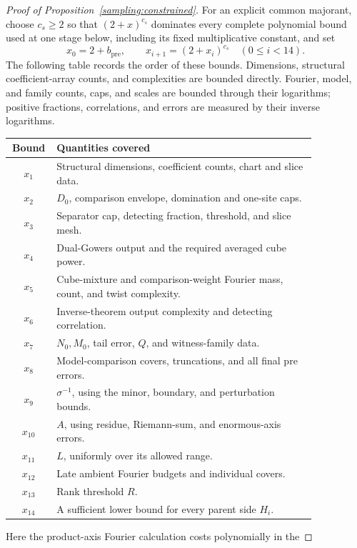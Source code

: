 \begin{proof}[Proof of Proposition~\ref{sampling:constrained}]
For an explicit common majorant, choose $c_s\ge2$ so that $(2+x)^{c_s}$ dominates every
complete polynomial bound used at one stage below, including its
fixed multiplicative constant, and set
\begin{equation}\label{cube:budget-majorant}
 x_0=2+b_{\mathrm{pre}},\qquad
 x_{i+1}=(2+x_i)^{c_s}\quad(0\le i<14).
\end{equation}
The following table records the order of these bounds.  Dimensions,
structural coefficient-array counts, and complexities are bounded
directly. Fourier, model, and family counts, caps, and scales are
bounded through their logarithms; positive fractions, correlations,
and errors are measured by their inverse logarithms.
\begin{center}
\small
\begin{tabular}{@{}cp{0.85\linewidth}@{}}
\toprule
Bound & Quantities covered\\
\midrule
$x_1$ & Structural dimensions, coefficient counts, chart and slice data.\\
$x_2$ & $D_0$, comparison envelope, domination and one-site caps.\\
$x_3$ & Separator cap, detecting fraction, threshold, and slice mesh.\\
$x_4$ & Dual-Gowers output and the required averaged cube power.\\
$x_5$ & Cube-mixture and comparison-weight Fourier mass, count, and twist complexity.\\
$x_6$ & Inverse-theorem output complexity and detecting correlation.\\
$x_7$ & $N_0,M_0$, tail error, $Q$, and witness-family data.\\
$x_8$ & Model-comparison covers, truncations, and all final pre errors.\\
$x_9$ & $\sigma^{-1}$, using the minor, boundary, and perturbation bounds.\\
$x_{10}$ & $A$, using residue, Riemann-sum, and enormous-axis errors.\\
$x_{11}$ & $L$, uniformly over its allowed range.\\
$x_{12}$ & Late ambient Fourier budgets and individual covers.\\
$x_{13}$ & Rank threshold $R$.\\
$x_{14}$ & A sufficient lower bound for every parent side $H_i$.\\
\bottomrule
\end{tabular}
\end{center}
Here the product-axis Fourier calculation costs polynomially in the

\end{proof}
